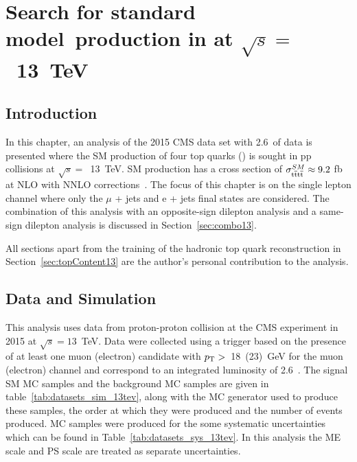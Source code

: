 \chapter{Search for standard model~\tttt production in \runtwo at $\sqrt{s} =$~13~TeV \label{c:Run2}}
\section{Introduction}
In this chapter, an analysis of the 2015 CMS data set with 2.6~\fbinv of data is presented where the SM production of four top quarks (\tttt) is sought in pp collisions at $\sqrt{s} =$~13~TeV. SM \tttt production has a cross section of $\sigma_{{\mathrm{t}\overline{\mathrm{t}}\mathrm{t}\overline{\mathrm{t}}}}^{SM}  \approx 9.2$ fb at NLO with NNLO corrections~\cite{Alwall2014,Bevilacqua2012}. The focus of this chapter is on the single lepton channel where only the $\mu$ + jets and e + jets final states are considered. The combination of this analysis with an opposite-sign dilepton analysis and a same-sign dilepton analysis is discussed in Section~\ref{sec:combo13}.

All sections apart from the training of the hadronic top quark reconstruction in Section~\ref{sec:topContent13} are the author's personal contribution to the analysis.

\section{Data and Simulation}
\label{sec:datasimulation13}
This analysis uses data from proton-proton collision at the CMS experiment in 2015 at $\sqrt{s}=13$~TeV.
Data were collected using a trigger based on the presence of at least one muon (electron) candidate with $p_{\mathrm{T}} > $~18~(23)~GeV for the muon (electron) channel and correspond to an integrated luminosity of 2.6~\fbinv .
The signal SM \tttt MC samples and the background MC samples are given in table~\ref{tab:datasets_sim_13tev}, along with the MC generator used to produce these samples, the order at which they were produced and the number of events produced. MC samples were produced for the some systematic uncertainties which can be found in Table~\ref{tab:datasets_sys_13tev}. In this analysis the ME scale and PS scale are treated as separate uncertainties.

